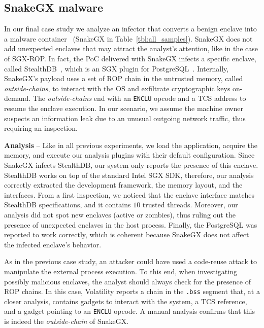 \subsection{SnakeGX malware}
\label{ssec:snakegx}

In our final case study we analyze an infector that converts a benign enclave 
into a malware container~\citep{snakegx} (SnakeGX in 
Table~\ref{tbl:all_samples}).
SnakeGX does not add unexpected enclaves that may attract the 
analyst's attention, like in the case of SGX-ROP.
In fact, the PoC delivered with SnakeGX infects a specific enclave, 
called StealthDB~\citep{stealthdb}, which is an SGX plugin for 
PostgreSQL~\citep{postgresql}.
Internally, SnakeGX's payload uses a set of ROP chain in the untrusted memory, 
called \emph{outside-chains}, to interact with the OS and exfiltrate 
cryptographic keys on-demand.
The \emph{outside-chains} end with an \texttt{ENCLU} opcode and a TCS address 
to resume the enclave execution.
In our scenario, we assume the machine owner suspects an information leak due 
to an unusual outgoing network traffic, thus requiring an inspection.

\vspace{0.2cm}
\noindent \textbf{Analysis} --
Like in all previous experiments, we load the application, acquire the memory, 
and execute our analysis plugins with their default configuration.
Since SnakeGX infects StealthDB, our system only reports the presence of this 
enclave.
StealthDB works on top of the standard Intel SGX SDK, therefore, our
analysis correctly extracted the development framework, the memory layout, and
the interfaces.
From a first inspection, we noticed that the enclave interface matches 
StealthDB specifications, and
it contains $10$ trusted threads.
Moreover, our analysis did not spot new enclaves (active or zombies), thus 
ruling out the presence of unexpected enclaves in the host process.
Finally, the PostgreSQL was reported to work correctly, which is coherent 
because SnakeGX does not affect the infected enclave's behavior.

As in the previous case study, 
an attacker could have used a
code-reuse attack to manipulate 
the external process execution. 
To this end, when investigating possibly malicious enclaves, the analyst should 
always check for the presence of ROP chains. 
In this case, Volatility reports a chain in the \texttt{.bss} segment that,
at a closer analysis, contains gadgets to interact with 
the system, a TCS reference, and a gadget pointing to an \texttt{ENCLU} 
opcode. A manual analysis confirms that this is indeed the 
\emph{outside-chain} of SnakeGX.

